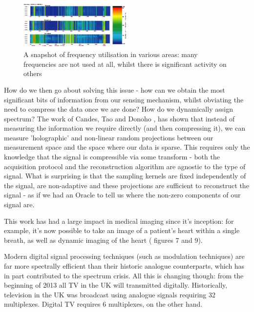 \documentclass[12pt, a4paper]{article}
\begin{document}
\begin{figure}[h]
\centering
\includegraphics[height = 7 cm, width=0.5\textwidth]{cr2.jpg}
\caption{A snapshot of frequency utilisation in various areas: many frequencies are not used at all, whilst there is significant activity on others \cite{Burbidge2007}}
\label{frequtil}
\end{figure}

How do we then go about solving this issue - how can we obtain the most significant bits of information from our sensing mechanism, whilst obviating the need to compress the data once we are done? How do we dynamically assign spectrum? The work of Candes, Tao \cite{Candes2006} and Donoho \cite{Donoho2006}, has shown that instead of measuring the information we require directly (and then compressing it), we can measure 'holographic' and non-linear random projections between our measurement space and the space where our data is sparse. This requires only the knowledge that the signal is compressible via some transform - both the acquisition protocol and the reconstruction algorithm are agnostic to the type of signal. What is surprising is that the sampling kernels are fixed independently of the signal, are non-adaptive and these projections are sufficient to reconstruct the signal - as if we had an Oracle to tell us where the non-zero components of our signal are. 

This work has had a large impact in medical imaging since it's inception: for example, it's now possible to take an image of a patient's heart within a single breath, as well as dynamic imaging of the heart (\cite{Donoho} figures 7 and 9).

Modern digital signal processing techniques (such as modulation techniques) are far more spectrally efficient than their historic analogue counterparts, which has in part contributed to the spectrum crisis. All this is changing though: from the beginning of 2013 all TV in the UK will transmitted digitally. Historically, television in the UK was broadcast using analogue signals requiring 32 multiplexes. Digital TV requires 6 multiplexes, on the other hand. 
\end{document}
